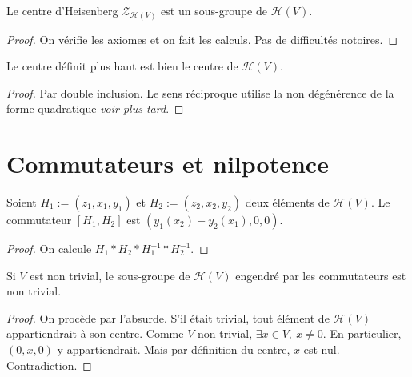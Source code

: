 \begin{proposition}
    \label{prop:center_H_subgroup}
    \leanok

    Le centre d'Heisenberg $\mathcal{Z}_{\mathcal{H}(V)}$ est un sous-groupe
    de $\mathcal{H}(V)$.
    \begin{proof}
        \leanok
        On vérifie les axiomes et on fait les calculs. Pas de difficultés notoires.
    \end{proof}
\end{proposition}

\begin{proposition}
    \label{prop:center_H_is_center}
    \leanok

    Le centre définit plus haut est bien le centre de $\mathcal{H}(V)$.
    \begin{proof}
        \leanok
        Par double inclusion. Le sens réciproque utilise la non dégénérence de la forme
        quadratique \textit{voir plus tard}.
    \end{proof}
\end{proposition}

\section{Commutateurs et nilpotence}

\begin{proposition}[Commutateur]
    \label{prop:commutator_H_of_elements}
    \leanok 

    Soient $H_1:=(z_1,x_1,y_1)$ et $H_2:=(z_2,x_2,y_2)$ deux éléments de 
    $\mathcal{H}(V)$. Le commutateur $[H_1,H_2]$ est $(y_1(x_2)-y_2(x_1),0,0)$.
    \begin{proof}
        \leanok
        On calcule $H_1*H_2*H_1^{-1}*H_2^{-1}$.
    \end{proof}
\end{proposition}

\begin{proposition}
    \label{prop:commutator_H_nontrivial}
    \leanok 

    Si $V$ est non trivial, le sous-groupe de $\mathcal{H}(V)$ engendré par les commutateurs est non trivial.
    \begin{proof}
        \leanok 
        On procède par l'absurde. S'il était trivial, tout élément de $\mathcal{H}(V)$
        appartiendrait à son centre.
        Comme $V$ non trivial, $\exists x\in V,\ x\ne0$. En particulier,
        $(0,x,0)$ y appartiendrait. Mais par définition du centre, $x$ est nul. Contradiction.
    \end{proof}
\end{proposition}

